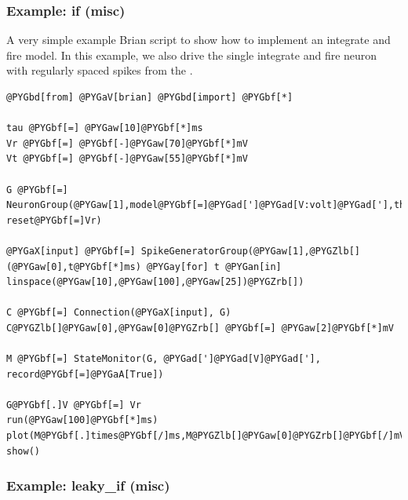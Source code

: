 \documentclass[letterpaper,10pt,english]{manual}
\begin{document}
\resetcurrentobjects
\hypertarget{--doc-examples-misc_if}{}

\hypertarget{index-67}{}\subsubsection{Example: if (misc)}

A very simple example Brian script to show how to implement
an integrate and fire model. In this example, we also
drive the single integrate and fire neuron with
regularly spaced spikes from the \hyperlink{brian.SpikeGeneratorGroup}{}.

\begin{Verbatim}[commandchars=@\[\]]
@PYGbd[from] @PYGaV[brian] @PYGbd[import] @PYGbf[*]

tau @PYGbf[=] @PYGaw[10]@PYGbf[*]ms
Vr @PYGbf[=] @PYGbf[-]@PYGaw[70]@PYGbf[*]mV
Vt @PYGbf[=] @PYGbf[-]@PYGaw[55]@PYGbf[*]mV

G @PYGbf[=] NeuronGroup(@PYGaw[1],model@PYGbf[=]@PYGad[']@PYGad[V:volt]@PYGad['],threshold@PYGbf[=]Vt, reset@PYGbf[=]Vr)

@PYGaX[input] @PYGbf[=] SpikeGeneratorGroup(@PYGaw[1],@PYGZlb[](@PYGaw[0],t@PYGbf[*]ms) @PYGay[for] t @PYGan[in] linspace(@PYGaw[10],@PYGaw[100],@PYGaw[25])@PYGZrb[])

C @PYGbf[=] Connection(@PYGaX[input], G)
C@PYGZlb[]@PYGaw[0],@PYGaw[0]@PYGZrb[] @PYGbf[=] @PYGaw[2]@PYGbf[*]mV

M @PYGbf[=] StateMonitor(G, @PYGad[']@PYGad[V]@PYGad['], record@PYGbf[=]@PYGaA[True])

G@PYGbf[.]V @PYGbf[=] Vr
run(@PYGaw[100]@PYGbf[*]ms)
plot(M@PYGbf[.]times@PYGbf[/]ms,M@PYGZlb[]@PYGaw[0]@PYGZrb[]@PYGbf[/]mV)
show()
\end{Verbatim}

\resetcurrentobjects
\hypertarget{--doc-examples-misc_leaky_if}{}

\hypertarget{index-68}{}\subsubsection{Example: leaky\_if (misc)}
\end{document}
